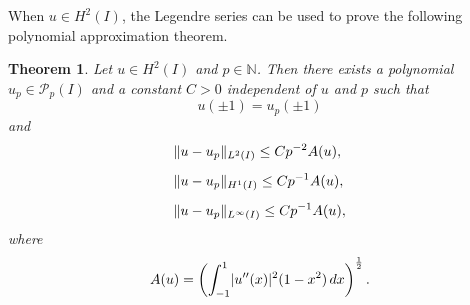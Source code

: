 \documentclass[english, 12pt, a4paper, sci, utf8, a-2b, online]{aaltothesis}
\theoremstyle{definition}
\theoremstyle{plain}
\newtheorem{theorem}{Theorem}[section]
\DeclarePairedDelimiter\abs{\lvert}{\rvert}
\DeclarePairedDelimiter\norm{\lVert}{\rVert}
\newcommand*\diff{\mathop{}\!d}
\numberwithin{equation}{section}
\begin{document}
When $u \in H^2(I)$, the Legendre series can be used to prove the following
polynomial approximation theorem.
\begin{theorem}
    \label{thm:polynomial_approximation_1d}
    Let $u \in H^2(I)$ and $p \in \mathbb{N}$.
    Then there exists a polynomial $u_p \in \mathcal{P}_p(I)$ and
    a constant $C > 0$ independent of $u$ and $p$ such that
    \begin{equation}
        \label{eq:polynomial_approximation_1d_endpoint_equality}
        u(\pm 1) = u_p(\pm 1)
    \end{equation}
    and
    \begin{align}
        \label{eq:polynomial_approximation_1d_res1}
        &\norm{u-u_p}_{L^2(I)} \leq C p^{-2} A(u), \\[0.5em]
        \label{eq:polynomial_approximation_1d_res2}
        &\norm{u-u_p}_{H^1(I)} \leq C p^{-1} A(u), \\[0.5em]
        \label{eq:polynomial_approximation_1d_res3}
        &\norm{u-u_p}_{L^{\infty}(I)} \leq C p^{-1} A(u),
    \end{align}
    where
    \begin{equation*}
        A(u) = \left(
            \int_{-1}^{1} \abs{u''(x)}^2 (1-x^2) \diff x
            \right)^{\frac{1}{2}}.
    \end{equation*}
\end{theorem}
\end{document}

